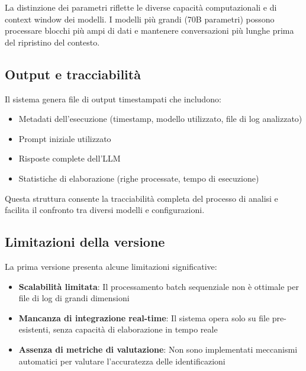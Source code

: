 \documentclass[12pt]{report}
\begin{document}

La distinzione dei parametri riflette le diverse capacità computazionali e di context window dei modelli. I modelli più grandi (70B parametri) possono processare blocchi più ampi di dati e mantenere conversazioni più lunghe prima del ripristino del contesto.

\subsection{Output e tracciabilità}
\label{subsec:ver1_output}

Il sistema genera file di output timestampati che includono:
\begin{itemize}
    \item Metadati dell'esecuzione (timestamp, modello utilizzato, file di log analizzato)
    \item Prompt iniziale utilizzato
    \item Risposte complete dell'LLM
    \item Statistiche di elaborazione (righe processate, tempo di esecuzione)
\end{itemize}

Questa struttura consente la tracciabilità completa del processo di analisi e facilita il confronto tra diversi modelli e configurazioni.

\subsection{Limitazioni della versione}
\label{subsec:ver1_limitazioni}

La prima versione presenta alcune limitazioni significative:

\begin{itemize}
    \item \textbf{Scalabilità limitata}: Il processamento batch sequenziale non è ottimale per file di log di grandi dimensioni
    \item \textbf{Mancanza di integrazione real-time}: Il sistema opera solo su file pre-esistenti, senza capacità di elaborazione in tempo reale
    \item \textbf{Assenza di metriche di valutazione}: Non sono implementati meccanismi automatici per valutare l'accuratezza delle identificazioni
\end{itemize}
\end{document}
